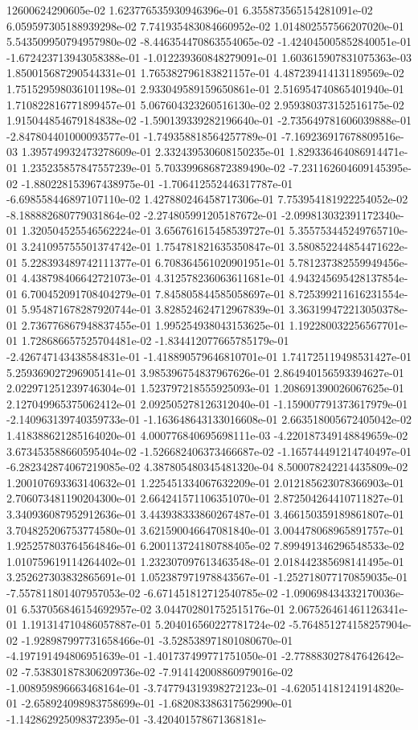 12600624290605e-02	1.623776535930946396e-01	6.355873565154281091e-02	6.059597305188939298e-02	7.741935483084660952e-02	1.014802557566207020e-01	5.543509950794957980e-02	-8.446354470863554065e-02	-1.424045005852840051e-01	-1.672423713943058388e-01	-1.012239360848279091e-01	1.603615907831075363e-03	1.850015687290544331e-01	1.765382796183821157e-01	4.487239414131189569e-02	1.751529598036101198e-01	2.933049589159650861e-01	2.516954740865401940e-01	1.710822816771899457e-01	5.067604323260516130e-02	2.959380373152516175e-02	1.915044854679184838e-02	-1.590139339282196640e-01	-2.735649781606039888e-01	-2.847804401000093577e-01	-1.749358818564257789e-01	-7.169236917678809516e-03	1.395749932473278609e-01	2.332439530608150235e-01	1.829336464086914471e-01	1.235235857847557239e-01	5.703399686872389490e-02	-7.231162604609145395e-02	-1.880228153967438975e-01	-1.706412552446317787e-01	-6.698558446897107110e-02	1.427880246458717306e-01	7.753954181922254052e-02	-8.188882680779031864e-02	-2.274805991205187672e-01	-2.099813032391172340e-01	1.320504525546562224e-01	3.656761615458539727e-01	5.355753445249765710e-01	3.241095755501374742e-01	1.754781821635350847e-01	3.580852244854471622e-01	5.228393489742111377e-01	6.708364561020901951e-01	5.781237382559949456e-01	4.438798406642721073e-01	4.312578236063611681e-01	4.943245695428137854e-01	6.700452091708404279e-01	7.845805844585058697e-01	8.725399211616231554e-01	5.954871678287920744e-01	3.828524624712967839e-01	3.363199472213050378e-01	2.736776867948837455e-01	1.995254938043153625e-01	1.192280032256567701e-01	1.728686657525704481e-02	-1.834412077665785179e-01	-2.426747143438584831e-01	-1.418890579646810701e-01	1.741725119498531427e-01	5.259369027296905141e-01	3.985396754837967626e-01	2.864940156593394627e-01	2.022971251239746304e-01	1.523797218555925093e-01	1.208691390026067625e-01	2.127049965375062412e-01	2.092505278126312040e-01	-1.159007791373617979e-01	-2.140963139740359733e-01	-1.163648643133016608e-01	2.663518005672405042e-02	1.418388621285164020e-01	4.000776840695698111e-03	-4.220187349148849659e-02	3.673453588660595404e-02	-1.526682406373466687e-02	-1.165744491214740497e-01	-6.282342874067219085e-02	4.387805480345481320e-04	8.500078242214435809e-02	1.200107693363140632e-01	1.225451334067632209e-01	2.012185623078366903e-01	2.706073481190204300e-01	2.664241571106351070e-01	2.872504264410711827e-01	3.340936087952912636e-01	3.443938333860267487e-01	3.466150359189861807e-01	3.704825206753774580e-01	3.621590046647081840e-01	3.004478068965891757e-01	1.925257803764564846e-01	6.200113724180788405e-02	7.899491346296548533e-02	1.010759619114264402e-01	1.232307097613463548e-01	2.018442385698141495e-01	3.252627303832865691e-01	1.052387971978843567e-01	-1.252718077170859035e-01	-7.557811801407957053e-02	-6.671451812712540785e-02	-1.090698434332170036e-01	6.537056846154692957e-02	3.044702801752515176e-01	2.067526461461126341e-01	1.191314710486057887e-01	5.204016560227781724e-02	-5.764851274158257904e-02	-1.928987997731658466e-01	-3.528538971801080670e-01	-4.197191494806951639e-01	-1.401737499771751050e-01	-2.778883027847642642e-02	-7.538301878306209736e-02	-7.914142008860979016e-02	-1.008959896663468164e-01	-3.747794319398272123e-01	-4.620514181241914820e-01	-2.658924098983758699e-01	-1.682083386317562990e-01	-1.142862925098372395e-01	-3.420401578671368181e-